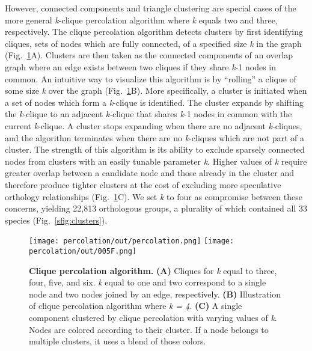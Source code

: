 However, connected components and triangle clustering are special cases of the more general \textit{k}-clique percolation algorithm where \textit{k} equals two and three, respectively. The clique percolation algorithm detects clusters by first identifying cliques, sets of nodes which are fully connected, of a specified size \textit{k} in the graph (Fig.~\ref{fig:percolation}A). Clusters are then taken as the connected components of an overlap graph where an edge exists between two cliques if they share \textit{k}-1 nodes in common. An intuitive way to visualize this algorithm is by ``rolling'' a clique of some size \textit{k} over the graph (Fig.~\ref{fig:percolation}B). More specifically, a cluster is initiated when a set of nodes which form a \textit{k}-clique is identified. The cluster expands by shifting the \textit{k}-clique to an adjacent \textit{k}-clique that shares \textit{k}-1 nodes in common with the current \textit{k}-clique. A cluster stops expanding when there are no adjacent \textit{k}-cliques, and the algorithm terminates when there are no \textit{k}-cliques which are not part of a cluster. The strength of this algorithm is its ability to exclude sparsely connected nodes from clusters with an easily tunable parameter \textit{k}. Higher values of \textit{k} require greater overlap between a candidate node and those already in the cluster and therefore produce tighter clusters at the cost of excluding more speculative orthology relationships (Fig.~\ref{fig:percolation}C). We set \textit{k} to four as compromise between these concerns, yielding 22,813 orthologous groups, a plurality of which contained all 33 species (Fig.~\ref{sfig:clusters}).

\begin{figure}[h!]
\texttt{[image: percolation/out/percolation.png]}
\texttt{[image: percolation/out/005F.png]}
\centering
\caption{\textbf{Clique percolation algorithm.}
\textbf{(A)} Cliques for \textit{k} equal to three, four, five, and six. \textit{k} equal to one and two correspond to a single node and two nodes joined by an edge, respectively. \textbf{(B)} Illustration of clique percolation algorithm where \textit{k = 4}. \textbf{(C)} A single component clustered by clique percolation with varying values of \textit{k}. Nodes are colored according to their cluster. If a node belongs to multiple clusters, it uses a blend of those colors.}
\label{fig:percolation}
\end{figure}

